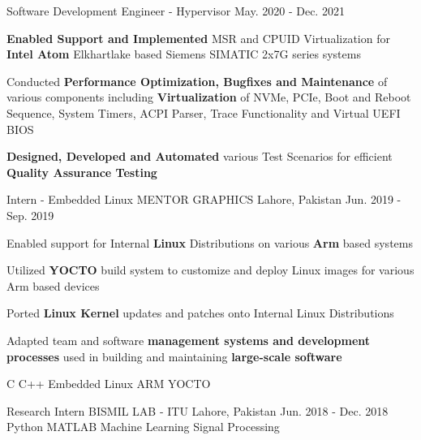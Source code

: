 \begin{cventries}
  \cventry
    {Software Development Engineer - Hypervisor} %
    {} %
    {} %
    {May. 2020 - Dec. 2021} %
    {
      \begin{cvitems} %
        \item \textbf{Enabled Support and Implemented} MSR and CPUID Virtualization for \textbf{Intel Atom} Elkhartlake based Siemens SIMATIC 2x7G series systems
        \item Conducted \textbf{Performance Optimization, Bugfixes and Maintenance} of various components including \textbf{Virtualization} of NVMe, PCIe, Boot and Reboot Sequence, System Timers, ACPI Parser, Trace Functionality and Virtual UEFI BIOS
        \item \textbf{Designed, Developed and Automated} various Test Scenarios for efficient \textbf{Quality Assurance Testing}
      \end{cvitems}
    }
    {}%

  \cventry
    {Intern - Embedded Linux} %
    {MENTOR GRAPHICS} %
    {Lahore, Pakistan} %
    {Jun. 2019 - Sep. 2019} %
    {
      \begin{cvitems} %
        \item Enabled support for Internal \textbf{Linux} Distributions on various \textbf{Arm }based systems
        \item Utilized \textbf{YOCTO} build system to customize and deploy Linux images for various Arm based devices
        \item Ported \textbf{Linux Kernel} updates and patches onto Internal Linux Distributions
        \item Adapted team and software \textbf{management systems and development processes} used in building and maintaining \textbf{large-scale software}
      \end{cvitems}
    }
    {C \acvSep C++ \acvSep Embedded Linux \acvSep ARM \acvSep YOCTO}

  \cventry
    {Research Intern} %
    {BISMIL LAB - ITU} %
    {Lahore, Pakistan} %
    {Jun. 2018 - Dec. 2018} %
    {}
    {Python \acvSep MATLAB \acvSep Machine Learning \acvSep Signal Processing}


\end{cventries}
